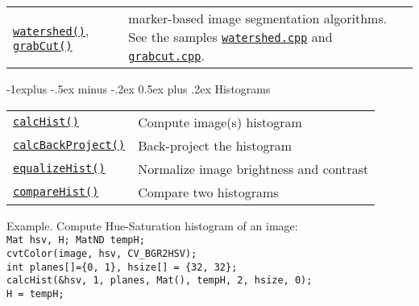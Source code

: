\documentclass[10pt,landscape]{article}
\makeatletter
\renewcommand{\subsection}{\@startsection{subsection}{2}{0mm}%
                                {-1explus -.5ex minus -.2ex}%
                                {0.5ex plus .2ex}%
                                {\normalfont\normalsize\bfseries}}
\makeatother
\begin{document}
\begin{multicols}{3}
\begin{tabular}{@{}p{\the\MyLen}%
                @{}p{\linewidth-\the\MyLen}@{}}
\texttt{\href{http://opencv.willowgarage.com/documentation/cpp/imgproc_miscellaneous_image_transformations.html\#floodfill}{watershed()}},
\texttt{\href{http://opencv.willowgarage.com/documentation/cpp/imgproc_miscellaneous_image_transformations.html\#grabcut}{grabCut()}}
 & marker-based image segmentation algorithms.
 See the samples \texttt{\href{https://code.ros.org/svn/opencv/trunk/opencv/samples/cpp/watershed.cpp}{watershed.cpp}} and \texttt{\href{https://code.ros.org/svn/opencv/trunk/opencv/samples/cpp/grabcut.cpp}{grabcut.cpp}}.

\end{tabular}

\subsection{Histograms}

\begin{tabular}{@{}p{\the\MyLen}%
                @{}p{\linewidth-\the\MyLen}@{}}

\texttt{\href{http://opencv.willowgarage.com/documentation/cpp/imgproc_histograms.html\#calchist}{calcHist()}} & Compute image(s) histogram \\

\texttt{\href{http://opencv.willowgarage.com/documentation/cpp/imgproc_histograms.html\#calcbackproject}{calcBackProject()}} & Back-project the histogram \\

\texttt{\href{http://opencv.willowgarage.com/documentation/cpp/imgproc_histograms.html\#equalizehist}{equalizeHist()}} & Normalize image brightness and contrast\\

\texttt{\href{http://opencv.willowgarage.com/documentation/cpp/imgproc_histograms.html\#comparehist}{compareHist()}} & Compare two histograms\\

\end{tabular}

\begin{tabbing}
Example. Compute Hue-Saturation histogram of an image:\\
\texttt{Mat hsv, H; MatND tempH;}\\
\texttt{cvtColor(image, hsv, CV\_BGR2HSV);}\\
\texttt{int planes[]=\{0, 1\}, hsize[] = \{32, 32\};}\\
\texttt{calcHist(\&hsv, 1, planes, Mat(), tempH, 2, hsize, 0);}\\
\texttt{H = tempH;}
\end{tabbing}


\end{multicols}
\end{document}
